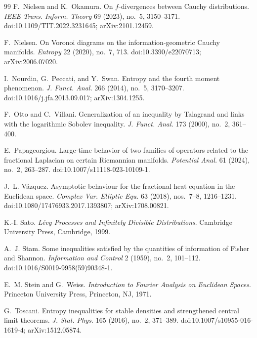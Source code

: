 \begin{thebibliography}{99}
F.~Nielsen and K.~Okamura.
\newblock On {$f$}-divergences between Cauchy distributions.
\newblock \emph{IEEE Trans. Inform. Theory} 69 (2023), no.~5, 3150--3171.
\newblock doi:10.1109/TIT.2022.3231645; arXiv:2101.12459.

F.~Nielsen.
\newblock On Voronoi diagrams on the information-geometric Cauchy manifolds.
\newblock \emph{Entropy} 22 (2020), no.~7, 713.
\newblock doi:10.3390/e22070713; arXiv:2006.07020.

I.~Nourdin, G.~Peccati, and Y.~Swan.
\newblock Entropy and the fourth moment phenomenon.
\newblock \emph{J. Funct. Anal.} 266 (2014), no.~5, 3170--3207.
\newblock doi:10.1016/j.jfa.2013.09.017; arXiv:1304.1255.

F.~Otto and C.~Villani.
\newblock Generalization of an inequality by Talagrand and links with the
logarithmic Sobolev inequality.
\newblock \emph{J. Funct. Anal.} 173 (2000), no.~2, 361--400.

E.~Papageorgiou.
\newblock Large-time behavior of two families of operators related to the
fractional Laplacian on certain Riemannian manifolds.
\newblock \emph{Potential Anal.} 61 (2024), no.~2, 263--287.
\newblock doi:10.1007/s11118-023-10109-1.

J.~L. V\'azquez.
\newblock Asymptotic behaviour for the fractional heat equation in the
Euclidean space.
\newblock \emph{Complex Var. Elliptic Equ.} 63 (2018), nos.~7--8,
1216--1231.
\newblock doi:10.1080/17476933.2017.1393807; arXiv:1708.00821.

K.-I. Sato.
\newblock \emph{L{\'e}vy Processes and Infinitely Divisible Distributions}.
\newblock Cambridge University Press, Cambridge, 1999.

A.~J. Stam.
\newblock Some inequalities satisfied by the quantities of information of
Fisher and Shannon.
\newblock \emph{Information and Control} 2 (1959), no.~2, 101--112.
\newblock doi:10.1016/S0019-9958(59)90348-1.

E.~M. Stein and G.~Weiss.
\newblock \emph{Introduction to Fourier Analysis on Euclidean Spaces}.
\newblock Princeton University Press, Princeton, NJ, 1971.

G.~Toscani.
\newblock Entropy inequalities for stable densities and strengthened central
limit theorems.
\newblock \emph{J. Stat. Phys.} 165 (2016), no.~2, 371--389.
\newblock doi:10.1007/s10955-016-1619-4; arXiv:1512.05874.


\end{thebibliography}

